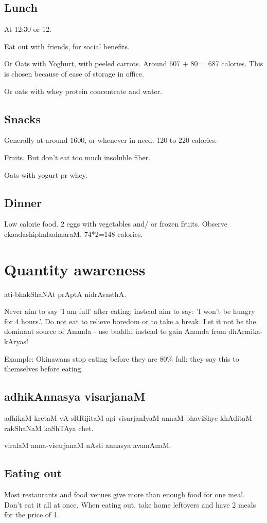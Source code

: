\documentclass[oneside, article]{memoir}
\begin{document}
\subsection{Lunch}
At 12:30 or 12.

Eat out with friends, for social benefits.

Or Oats with Yoghurt, with peeled carrots. Around 607 + 80 = 687 calories. This is chosen because of ease of storage in office.

Or oats with whey protein concentrate and water.

\subsection{Snacks}
Generally at around 1600, or whenever in need. 120 to 220 calories.

Fruits. But don't eat too much insoluble fiber.

Oats with yogurt pr whey.

\subsection{Dinner}
Low calorie food. 2 eggs with vegetables and/ or frozen fruits. Observe ekaadashiphalaahaaraM. 74*2=148 calories.

\section{Quantity awareness}
ati-bhakShaNAt prAptA nidrAvasthA.

Never aim to say 'I am full' after eating; instead aim to say: 'I won't be hungry for 4 hours.'. Do not eat to relieve boredom or to take a break. Let it not be the dominant source of Ananda - use buddhi instead to gain Ananda from dhArmika-kAryas!

Example: Okinawans stop eating before they are 80\% full: they say this to themselves before eating.

\subsection{adhikAnnasya visarjanaM}
adhikaM kretaM vA sRRijitaM api visarjanIyaM annaM bhaviShye khAditaM rakShaNaM kaShTAya chet.

viralaM anna-visarjanaM nAsti annasya avamAnaM.

\subsection{Eating out}
Most restaurants and food venues give more than enough food for one meal. Don't eat it all at once. When eating out, take home leftovers and have 2 meals for the price of 1.
\end{document}
